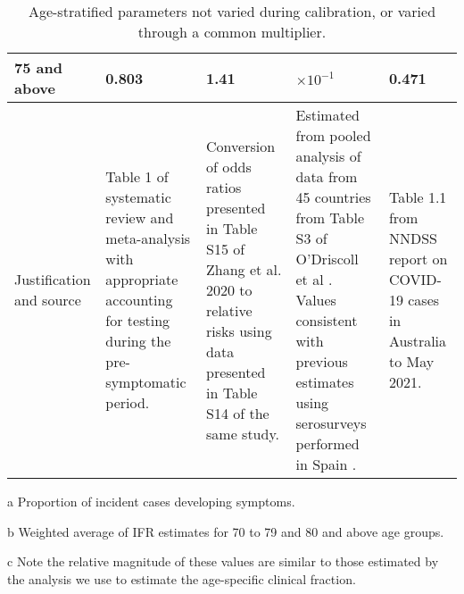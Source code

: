 \begin{table}
\begin{threeparttable}
\begin{tabularx}{\textwidth}{| X | X | X | X | X |}
        \hline
        75 and above & 0.803 & 1.41 & $\times10^{-1}$\tnote{b} & 0.471 \\
        \hline
        Justification and source & 
        Table 1 of systematic review and meta-analysis with appropriate accounting for testing during the pre-symptomatic period\cite{sah-2021}. & 
        Conversion of odds ratios presented in Table S15 of Zhang et al. 2020 to relative risks using data presented in Table S14 of the same study\cite{zhang-2020-a}\tnote{c}. &
        Estimated from pooled analysis of data from 45 countries from Table S3 of O'Driscoll et al \cite{odriscoll-2021}. 
        Values consistent with previous estimates using serosurveys performed in Spain \cite{pollan-2020}. &
        Table 1.1 from NNDSS report on COVID-19 cases in Australia to May 2021. \\ 
        \hline
	\end{tabularx}
	\caption{Age-stratified parameters not varied during calibration, or varied through a common multiplier.}
	\label{tab:age_params}
    \begin{tablenotes}
        \item[a] Proportion of incident cases developing symptoms.
        \item[b] Weighted average of IFR estimates for 70 to 79 and 80 and above age groups.
        \item[c] Note the relative magnitude of these values are similar to those estimated by the analysis we use to estimate the age-specific clinical fraction.
    \end{tablenotes}
    \end{threeparttable}
\end{table}
